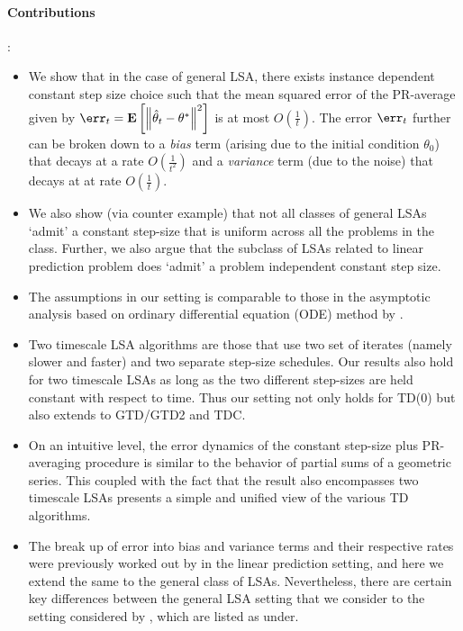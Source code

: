 \paragraph{Contributions}:
\begin{itemize}[leftmargin=*, before = \leavevmode\vspace{-\baselineskip}]
\item We show that in the case of general LSA, there exists instance dependent constant step size choice such that the mean squared error of the PR-average given by $\err_t=\EE{\norm{\thh_t-\ts}^2}$ is at most $O(\frac{1}{t})$. The error $\err_t$ further can be broken down to a \emph{bias} term (arising due to the initial condition $\theta_0$) that decays at a rate $O(\frac{1}{t^2})$ and a \emph{variance} term (due to the noise) that decays at at rate $O(\frac{1}{t})$.
\item We also show (via counter example) that not all classes of general LSAs `admit' a constant step-size that is uniform across all the problems in the class. Further, we also argue that the subclass of LSAs related to linear prediction problem does `admit' a problem independent constant step size.
\item The assumptions in our setting is comparable to those in the asymptotic analysis based on ordinary differential equation (ODE) method by \cite{borkarmeyn,borkarbook}.
\item Two timescale LSA algorithms are those that use two set of iterates (namely slower and faster) and two separate step-size schedules. Our results also hold for two timescale LSAs as long as the two different step-sizes are held constant with respect to time. Thus our setting not only holds for TD(0) but also extends to GTD/GTD2 and TDC.
\item On an intuitive level, the error dynamics of the constant step-size plus PR-averaging procedure is similar to the behavior of partial sums of a geometric series. This coupled with the fact that the result also encompasses two timescale LSAs presents a simple and unified view of the various TD algorithms.
\item The break up of error into bias and variance terms and their respective rates were previously worked out by \cite{bach} in the linear prediction setting, and here we extend the same to the general class of LSAs. Nevertheless, there are certain key differences between the general LSA setting that we consider to the setting considered by \cite{bach}, which are listed as under.
\end{itemize}
